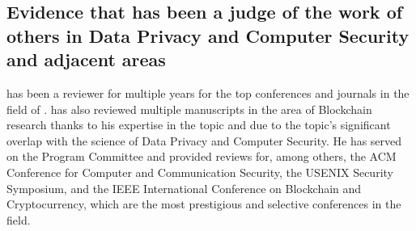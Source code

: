 \subsection{Evidence that \dr has been a judge of the work of others 
	in Data Privacy and Computer Security and adjacent areas}
\label{sec:judging}

\dr has been a reviewer for multiple years for the top conferences and journals 
in the field of \dpcs.
\dr has also reviewed multiple manuscripts in the area of Blockchain research 
thanks to his expertise in the topic and due to the topic's
significant overlap with the science of Data Privacy and Computer Security.
He has served on the Program Committee and provided reviews for, 
among others, the ACM Conference for Computer 
and Communication Security, the USENIX Security Symposium, and 
the IEEE International Conference on Blockchain and Cryptocurrency, which are 
the most prestigious and selective conferences in the field.

